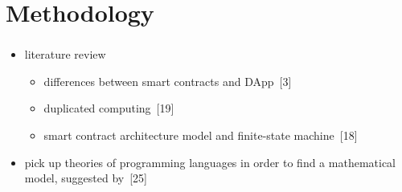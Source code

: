 \documentclass[xcolor=svgnames]{beamer}
\begin{document}
\section{Methodology}
\begin{frame}[t]
\frametitle{}
\begin{itemize}
\item<2-> literature review
	\begin{itemize}
	\item differences between smart contracts and DApp~[3]
	\item duplicated computing~[19]
	\item smart contract architecture model and finite-state machine~[18]
	\end{itemize}

\item<3-> pick up theories of programming languages in order to find a mathematical model, suggested by~[25]


\end{itemize}
\end{frame}
\end{document}
